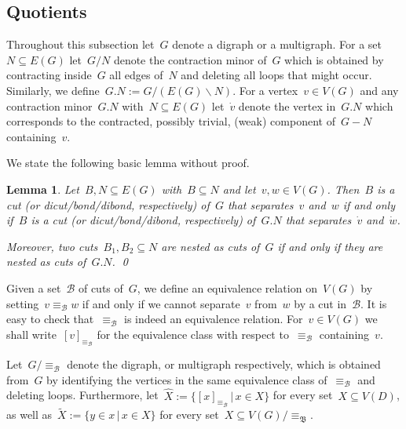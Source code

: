 \documentclass[reqno, 12pt]{amsart}
\numberwithin{equation}{section}
\numberwithin{figure}{section}
\let\setminus=\smallsetminus
\theoremstyle{plain}
\newtheorem{lemma}[thm]{Lemma}
\theoremstyle{definition}
\begin{document}
\subsection{Quotients}
\label{subsec:quotients}

Throughout this subsection let~$G$ denote a digraph or a multigraph. For a set~${N \subseteq E(G)}$ let~${G{/}N}$ denote the contraction minor of~$G$ which is obtained by contracting inside~$G$ all edges of~$N$ and deleting all loops that might occur. 
Similarly, we define~${G{.}N := G{/}(E(G) \setminus N)}$.
For a vertex~${v \in V(G)}$ and any contraction minor~${G{.}N}$ with~${N \subseteq E(G)}$ let~$\dot{v}$ denote the vertex in~${G{.}N}$ which corresponds to the contracted, possibly trivial, (weak) component of~${G - N}$ containing~$v$.

We state the following basic lemma without proof.

\begin{lemma}
    \label{lem:contr-cuts}
    Let~${B, N \subseteq E(G)}$ with~${B \subseteq N}$ and 
    let~${v, w \in V(G)}$. 
    Then~$B$ is a cut (or dicut/bond/dibond, respectively) of~$G$ that separates~$v$ and~$w$ if and only if~$B$ is a cut (or dicut/bond/dibond, respectively) of~$G{.}N$ that separates~$\dot{v}$ and~$\dot{w}$. 
    
    Moreover, two cuts~${B_1, B_2 \subseteq N}$ are nested as cuts of~$G$ if and only if they are nested as cuts of~$G{.}N$.
    \qed
\end{lemma}


Given a set~$\mathcal{B}$ of cuts of~$G$, we define an equivalence relation on~$V(G)$ 
by setting~${v \equiv_\mathcal{B} w}$ if and only if 
we cannot separate~$v$ from~$w$ by a cut in~$\mathcal{B}$. 
It is easy to check that~$\equiv_\mathcal{B}$ is indeed an equivalence relation.
For~${v \in V(G)}$ we shall write~${[v]_{\equiv_\mathcal{B}}}$ for the equivalence class with respect to~$\equiv_\mathcal{B}$ containing~$v$. 

Let~${G{/}{\equiv_\mathcal{B}}}$ denote the digraph, or multigraph respectively, 
which is obtained from~$G$ by identifying the vertices in the same equivalence class of~$\equiv_\mathcal{B}$ and deleting loops. 
Furthermore, let~${\hat{X} := \{ [x]_{\equiv_\mathcal{B}} \, | \, x \in X \}}$ for every set~${X \subseteq V(D)}$, 
as well as~${\tilde{X} := \{ y \in x \, | \, x \in X \}}$ for every set~${X \subseteq V(G){/}\equiv_\mathfrak{B}}$.
\end{document}
